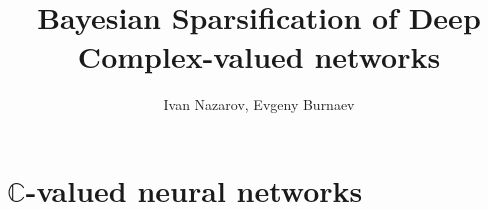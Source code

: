 \documentclass[handout]{beamer}
\title[Exam]{Bayesian Sparsification of Deep Complex-valued networks}
\author[Nazarov I., Burnaev E.]{Ivan Nazarov, Evgeny Burnaev}
\date{}
\institute[Skoltech]{ADASE Skoltech \\ Moscow, Russia}
\newcommand{\real}{\mathbb{R}}
\newcommand{\cplx}{\mathbb{C}}
\begin{document}
\begin{frame}
  \titlepage

\end{frame}







\section{$\cplx$-valued neural networks} %
\label{sec:complex_valued_networks}
\end{document}
